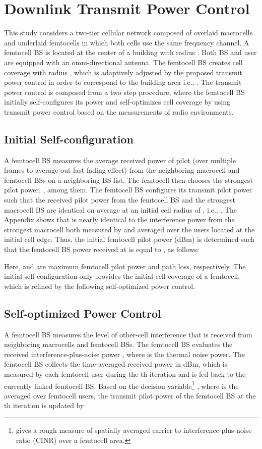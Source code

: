 \documentclass[draftclsnofoot,12pt,onecolumn]{IEEEtran}
\begin{document}
\section{Downlink Transmit Power Control}\label{sec:TPC}

This study considers a two-tier cellular network composed of
overlaid macrocells and underlaid femtocells in which both cells use
the same frequency channel. A femtocell BS is located at the center
of a building with radius . Both BS and user are equipped with
an omni-directional antenna. The femtocell BS creates cell coverage
with radius , which is adaptively adjusted by the proposed
transmit power control in order to correspond to the building area
i.e., . The transmit power control is composed from a two
step procedure, where the femtocell BS initially self-configures its
power and self-optimizes cell coverage by using transmit power
control based on the measurements of radio environments.

\subsection{Initial Self-configuration}
A femtocell BS measures the average received power of pilot (over
multiple frames to average out fast fading effect) from the
neighboring macrocell and femtocell BSs on a neighboring BS list.
The femtocell then chooses the strongest pilot power, ,
among them. The femtocell BS configures its transmit pilot power
such that the received pilot power from the femtocell BS and the
strongest macrocell BS are identical on average at an initial cell
radius of , i.e., . The Appendix shows that
 is nearly identical to the interference power from the
strongest macrocell both measured by and averaged over the users
located at the initial cell edge. Thus, the initial femtocell pilot
power  (dBm) is determined such that the femtocell BS
power received at  is equal to , as follows:

Here,  and  are maximum femtocell pilot power and path
loss, respectively. The initial self-configuration only provides the
initial cell coverage of a femtocell, which is refined by the
following self-optimized power control.


\subsection{Self-optimized Power Control}
A femtocell BS measures the level of other-cell interference
 that is received from neighboring macrocells and femtocell
BSs. The femtocell BS evaluates the received interference-plus-noise
power , where  is the thermal noise
power. The femtocell BS collects the time-averaged received power
 in dBm, which is measured by each femtocell user during
the th iteration and is fed back to the currently linked
femtocell BS.
Based on the decision variable\footnote{ gives a rough measure of spatially averaged carrier to
interference-plus-noise ratio (CINR) over a femtocell area.}
, where 
is the averaged  over femtocell users, the transmit pilot
power of the femtocell BS at the th iteration is updated by
\end{document}
